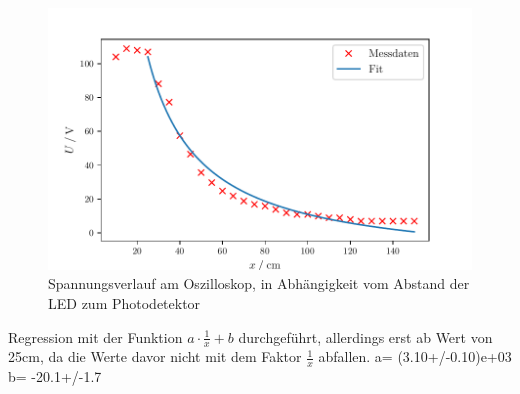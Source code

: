 \begin{figure}
  \centering
  \includegraphics{build/plot3.pdf}
  \caption{Spannungsverlauf am Oszilloskop, in Abhängigkeit vom Abstand der LED zum Photodetektor}
  \label{fig:plot3}
\end{figure}

Regression mit der Funktion $a \cdot \frac{1}{x} +b$ durchgeführt, allerdings erst ab Wert von 25cm, da die Werte davor nicht mit dem Faktor $\frac{1}{x}$ abfallen.
a= (3.10+/-0.10)e+03
b= -20.1+/-1.7


